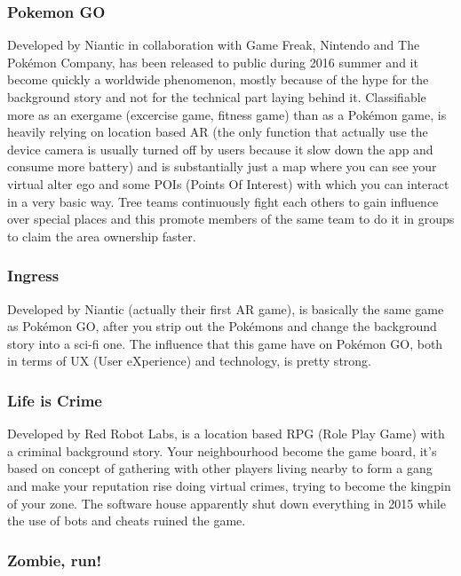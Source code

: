 			\subsubsection{Pokemon GO}
			
				Developed by Niantic in collaboration with Game Freak, Nintendo and The Pokémon Company, has been released to public during 2016 summer and it become quickly a worldwide phenomenon, mostly because of the hype for the background story and not for the technical part laying behind it.
				Classifiable more as an exergame (excercise game, fitness game) than as a Pokémon game, is heavily relying on location based AR (the only function that actually use the device camera is usually turned off by users because it slow down the app and consume more battery) and is substantially just a map where you can see your virtual alter ego and some POIs (Points Of Interest) with which you can interact in a very basic way.
				Tree teams continuously fight each others to gain influence over special places and this promote members of the same team to do it in groups to claim the area ownership faster.
			
			\subsubsection{Ingress}
			
				Developed by Niantic (actually their first AR game), is basically the same game as Pokémon GO, after you strip out the Pokémons and change the background story into a sci-fi one.
				The influence that this game have on Pokémon GO, both in terms of UX (User eXperience) and technology, is pretty strong.
			
			\subsubsection{Life is Crime}
			
				Developed by Red Robot Labs, is a location based RPG (Role Play Game) with a criminal background story. Your neighbourhood become the game board, it's based on concept of gathering with other players living nearby to form a gang and make your reputation rise doing virtual crimes, trying to become the kingpin of your zone.
				The software house apparently shut down everything in 2015 while the use of bots and cheats ruined the game.
			
			\subsubsection{Zombie, run!}
			
